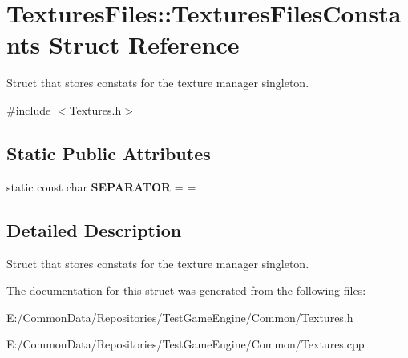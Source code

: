 \hypertarget{struct_textures_files_1_1_textures_files_constants}{}\section{Textures\+Files\+::Textures\+Files\+Constants Struct Reference}
\label{struct_textures_files_1_1_textures_files_constants}


Struct that stores constats for the texture manager singleton.  




{\ttfamily \#include $<$Textures.\+h$>$}

\subsection*{Static Public Attributes}
\begin{DoxyCompactItemize}
\item 
\mbox{\label{struct_textures_files_1_1_textures_files_constants_aa6b311fc928c037b5c9eb819058226f9}} 
static const char {\bfseries S\+E\+P\+A\+R\+A\+T\+OR} = \textquotesingle{}=\textquotesingle{}
\end{DoxyCompactItemize}


\subsection{Detailed Description}
Struct that stores constats for the texture manager singleton. 

The documentation for this struct was generated from the following files\+:\begin{DoxyCompactItemize}
\item 
E\+:/\+Common\+Data/\+Repositories/\+Test\+Game\+Engine/\+Common/Textures.\+h\item 
E\+:/\+Common\+Data/\+Repositories/\+Test\+Game\+Engine/\+Common/Textures.\+cpp\end{DoxyCompactItemize}
